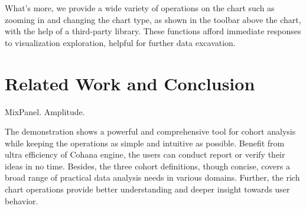 \documentclass[10pt,conference,letterpaper]{IEEEtran}
\begin{document}
What's more, we provide a wide variety of operations on the chart such as zooming in and changing the chart type, as shown in the toolbar above the chart, with the help of a third-party library. These functions afford immediate responses to visualization exploration, helpful for further data excavation.

\section{Related Work and Conclusion}

MixPanel. Amplitude. 

The demonstration shows a powerful and comprehensive tool for cohort analysis while keeping the operations as simple and intuitive as possible. Benefit from ultra efficiency of Cohana engine, the users can conduct report or verify their ideas in no time. Besides, the three cohort definitions, though concise, covers a broad range of practical data analysis needs in various domains. Further, the rich chart operations provide better understanding and deeper insight towards user behavior.







\end{document}
